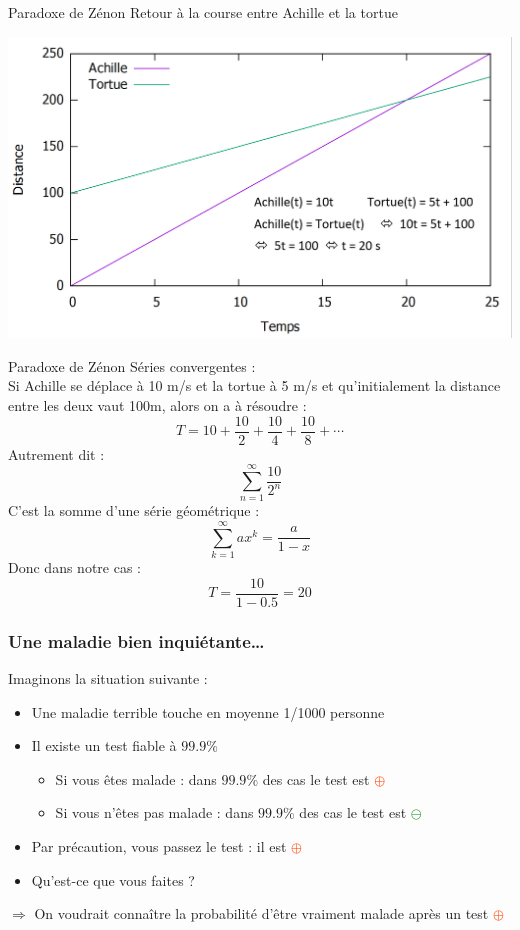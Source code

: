 \documentclass[usenames, dvipsnames]{beamer}
\begin{document}
\begin{frame}[plain]{Paradoxe de Zénon}
Retour à la course entre Achille et la tortue 
\pause
\begin{center}
\includegraphics[scale=0.35]{images/ZAPT3.png}
\end{center}
\end{frame}




\begin{frame}[plain]{Paradoxe de Zénon}
Séries convergentes :
\\ Si Achille se déplace à 10 m/s et la tortue à 5 m/s et qu'initialement la distance entre les deux vaut 100m, alors on a à résoudre : 
\[ T = 10 + \frac{10}{2} +  \frac{10}{4} + \frac{10}{8} + \cdots\] \pause
Autrement dit :
\[ \sum_{n=1}^{\infty} \frac{10}{2^n}\]
C'est la somme d'une série géométrique : \[\sum_{k=1}^{\infty} ax^k = \frac{a}{1-x} \] \pause 
Donc dans notre cas : \[ T = \frac{10}{1- 0.5} = 20 \]
\end{frame}

\begin{frame}[plain]
\frametitle{Une maladie bien inquiétante\dots}

Imaginons la situation suivante :

\begin{itemize}
\item Une maladie terrible touche en moyenne 1/1000 personne
\item Il existe un test fiable à $99.9\%$ \pause
\begin{itemize}
\item Si vous êtes malade : dans $99.9\%$ des cas le test est \textcolor{OrangeRed}{$\oplus$}
\item Si vous n'êtes pas malade : dans $99.9\%$ des cas le test est \textcolor{ForestGreen}{$\ominus$}
\end{itemize}
\item Par précaution, vous passez le test : il est \textcolor{OrangeRed}{$\oplus$} \pause
\item Qu'est-ce que vous faites ? \pause
\end{itemize}

$\Rightarrow$ On voudrait connaître la probabilité d'être vraiment malade après un test \textcolor{OrangeRed}{$\oplus$}

\end{frame}
\end{document}
